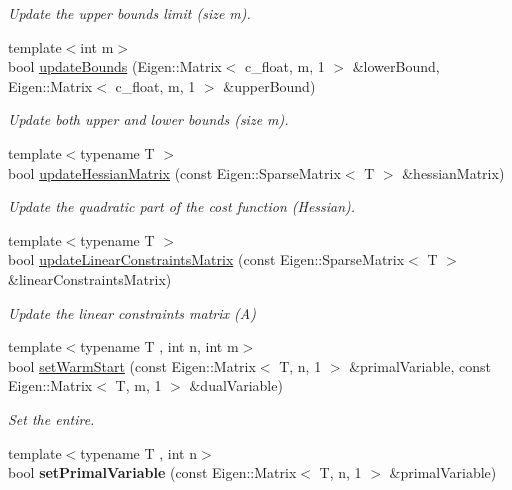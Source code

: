 \begin{DoxyCompactItemize}
\begin{DoxyCompactList}\small\item\em Update the upper bounds limit (size m). \end{DoxyCompactList}\item 
{\footnotesize template$<$int m$>$ }\\bool \hyperlink{classOSQPWrapper_1_1OptimizerSolver_a3934859f7cbfa10587ae81c6f0bfd436}{update\+Bounds} (Eigen\+::\+Matrix$<$ c\+\_\+float, m, 1 $>$ \&lower\+Bound, Eigen\+::\+Matrix$<$ c\+\_\+float, m, 1 $>$ \&upper\+Bound)
\begin{DoxyCompactList}\small\item\em Update both upper and lower bounds (size m). \end{DoxyCompactList}\item 
{\footnotesize template$<$typename T $>$ }\\bool \hyperlink{classOSQPWrapper_1_1OptimizerSolver_addbbf25bcb77fcf584a74e6959a0cd29}{update\+Hessian\+Matrix} (const Eigen\+::\+Sparse\+Matrix$<$ T $>$ \&hessian\+Matrix)
\begin{DoxyCompactList}\small\item\em Update the quadratic part of the cost function (Hessian). \end{DoxyCompactList}\item 
{\footnotesize template$<$typename T $>$ }\\bool \hyperlink{classOSQPWrapper_1_1OptimizerSolver_a244a853420a4e758d8a37eae7852ea98}{update\+Linear\+Constraints\+Matrix} (const Eigen\+::\+Sparse\+Matrix$<$ T $>$ \&linear\+Constraints\+Matrix)
\begin{DoxyCompactList}\small\item\em Update the linear constraints matrix (A) \end{DoxyCompactList}\item 
{\footnotesize template$<$typename T , int n, int m$>$ }\\bool \hyperlink{classOSQPWrapper_1_1OptimizerSolver_a813204380e8097520e9dd9ada1d50d44}{set\+Warm\+Start} (const Eigen\+::\+Matrix$<$ T, n, 1 $>$ \&primal\+Variable, const Eigen\+::\+Matrix$<$ T, m, 1 $>$ \&dual\+Variable)
\begin{DoxyCompactList}\small\item\em Set the entire. \end{DoxyCompactList}\item 
{\footnotesize template$<$typename T , int n$>$ }\\bool {\bfseries set\+Primal\+Variable} (const Eigen\+::\+Matrix$<$ T, n, 1 $>$ \&primal\+Variable)\label{classOSQPWrapper_1_1OptimizerSolver_aa6c3e97c704e4b7177bc76e1f4eb35fd}


\end{DoxyCompactItemize}
